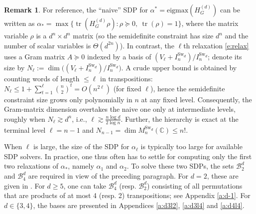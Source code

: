 \documentclass[12pt,dvipsnames,accepted=2016-08-18,a4paper,onecolumn]{quantumarticle}
\DeclareMathOperator{\Tr}{tr}
\numberwithin{equation}{section}
\newcommand{\cB}{\mathcal B}
\theoremstyle{definition}
\newtheorem{remark}[theorem]{Remark}
\begin{document}
\begin{remark}
For reference, the ``naive'' SDP for $\alpha^\ast=\mathrm{eigmax}(H_G^{(d)})$ can be written as
$\alpha_*=\max\{\Tr(H_G^{(d)}\rho): \rho\succeq 0,\ \Tr(\rho)=1\}$, where the matrix variable
$\rho$ is a $d^n\times d^n$ matrix (so the semidefinite constraint has size $d^n$ and the number
of scalar variables is $\Theta(d^{2n})$).
In contrast, the $\ell$th relaxation \eqref{e:relax} uses a Gram matrix $A\succeq 0$ indexed by
a basis of $(V_\ell+I_n^{\text{Sw}_d})/I_n^{\text{Sw}_d}$; denote its size by
$N_\ell:=\dim\big((V_\ell+I_n^{\text{Sw}_d})/I_n^{\text{Sw}_d}\big)$.
A crude upper bound is obtained by counting words of length $\le \ell$ in transpositions:
$N_\ell\le 1+\sum_{t=1}^{\ell}\binom{n}{2}^t = O(n^{2\ell})$ (for fixed $\ell$), hence the semidefinite
constraint size grows only polynomially in $n$ at any fixed level.
Consequently, the Gram-matrix dimension overtakes the naive one only at intermediate levels,
roughly when $N_\ell\gtrsim d^n$, i.e., $\ell \gtrsim \frac{n\log d}{2\log n}$.
Further, the hierarchy is exact 
 at the terminal level $\ell=n-1$ and
$N_{n-1}=\dim M_n^{\text{Sw}_d}(\mathbb{C})\le n!$.
\end{remark}

When $\ell$ is large, the size of the SDP for $\alpha_\ell$ is typically too large for available SDP solvers. In practice, one thus often has to settle for computing only the first two relaxations of $\alpha_*$, namely $\alpha_1$ and $\alpha_2$.
To solve these two SDPs, the sets $\cB^{d}_2$ and $\cB^{d}_4$ are required in view of the preceding paragraph. For $d=2$, these are given in \cite[Subsection 4.3.2 and Appendix B.2]{BCEHK24}.
For $d\ge 5$, one can take $\cB^{d}_4$ (resp. $\cB^{d}_2$) consisting of all permutations that are products of at most 4 (resp. 2) transpositions; see Appendix \ref{a:d-1}.
For $d\in\{3,4\}$, the bases are presented in Appendices \ref{a:d3l2}, \ref{a:d3l4} and \ref{a:d4l4}.
\end{document}
